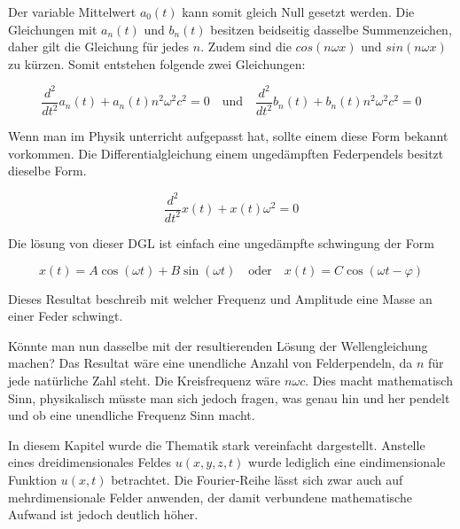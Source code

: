 Der variable Mittelwert $a_0(t)$ kann somit gleich Null gesetzt werden.
Die Gleichungen mit $a_n(t)$ und $b_n(t)$ besitzen beidseitig dasselbe Summenzeichen, daher gilt die Gleichung für jedes $n$. 
Zudem sind die $cos(n\omega x)$ und $sin(n\omega x)$ zu kürzen. 
Somit entstehen folgende zwei Gleichungen:

\begin{equation}
	\frac{d^2}{dt^2} a_n(t) + a_n(t) n^2 \omega^2 c^2 = 0
	  \quad   \text{und} \quad  \frac{d^2}{dt^2} b_n(t) + b_n(t) n^2 \omega^2 c^2 = 0
\end{equation}

Wenn man im Physik unterricht aufgepasst hat, sollte einem diese Form bekannt vorkommen. Die Differentialgleichung einem ungedämpften Federpendels besitzt dieselbe Form. 

\begin{equation}
	\frac{d^2}{dt^2} x(t) + x(t) \omega^2  = 0
\end{equation}

Die lösung von dieser DGL ist einfach eine ungedämpfte schwingung der Form 

\begin{equation}
x(t) = A \cos(\omega t) + B \sin(\omega t) \quad \text{oder} \quad x(t) = C \cos(\omega t - \varphi)
\end{equation}

Dieses Resultat beschreib mit welcher Frequenz und Amplitude eine Masse an einer Feder schwingt. 

Könnte man nun dasselbe mit der resultierenden Lösung der Wellengleichung machen?
Das Resultat wäre eine unendliche Anzahl von Felderpendeln, da $n$ für jede natürliche Zahl steht. 
Die Kreisfrequenz wäre  $n \omega c$. 
Dies macht mathematisch Sinn, physikalisch müsste man sich jedoch fragen, was genau hin und her pendelt und ob eine unendliche Frequenz Sinn macht.


In diesem Kapitel wurde die Thematik stark vereinfacht dargestellt. 
Anstelle eines dreidimensionales Feldes $u(x,y,z,t)$ wurde lediglich eine eindimensionale Funktion $u(x,t)$ betrachtet. Die Fourier-Reihe lässt sich zwar auch auf mehrdimensionale Felder anwenden, der damit verbundene mathematische Aufwand ist jedoch deutlich höher. 









